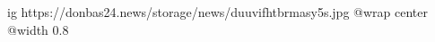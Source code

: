  
 
 
 
 

\ifcmt
  ig https://donbas24.news/storage/news/duuvifhtbrmasy5s.jpg
  @wrap center
  @width 0.8
\fi
